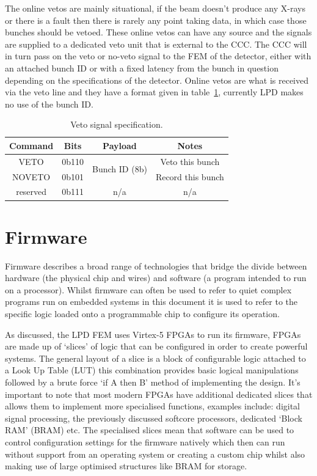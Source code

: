The online vetos are mainly situational, if the beam doesn't produce any X-rays or there is a fault then there is rarely any point taking data, in which case those bunches should be vetoed. These online vetos can have any source and the signals are supplied to a dedicated veto unit that is external to the CCC. The CCC will in turn pass on the veto or no-veto signal to the FEM of the detector, either with an attached bunch ID or with a fixed latency from the bunch in question depending on the specifications of the detector. Online vetos are what is received via the veto line and they have a format given in table~\ref{tab:veto_spec}, currently LPD makes no use of the bunch ID.
\begin{table}[htbp]
  \begin{center}
  \begin{tabular}{c|c|c|c}
    Command & Bits   & Payload                        & Notes\\
    \hline
    VETO    & 0b110  & \multirow{2}{*}{Bunch ID (8b)} & Veto this bunch \\
    NOVETO  & 0b101  &                                & Record this bunch \\
    reserved& 0b111  & n/a                            & n/a \\
  \end{tabular}
  \end{center}
  \caption{Veto signal specification.}
  \label{tab:veto_spec}
\end{table}
\section{Firmware} %
\label{sec:firmware}
Firmware describes a broad range of technologies that bridge the divide between hardware (the physical chip and wires) and software (a program intended to run on a processor). Whilst firmware can often be used to refer to quiet complex programs run on embedded systems in this document it is used to refer to the specific logic loaded onto a programmable chip to configure its operation.

As discussed, the LPD FEM uses Virtex-5 FPGAs to run its firmware, FPGAs are made up of `slices' of logic that can be configured in order to create powerful systems. The general layout of a slice is a block of configurable logic attached to a Look Up Table (LUT) this combination provides basic logical manipulations followed by a brute force `if A then B' method of implementing the design. It's important to note that most modern FPGAs have additional dedicated slices that allows them to implement more specialised functions, examples include: digital signal processing, the previously discussed softcore processors, dedicated `Block RAM' (BRAM) etc. The specialised slices mean that software can be used to control configuration settings for the firmware natively which then can run without support from an operating system or creating a custom chip whilst also making use of large optimised structures like BRAM for storage.

